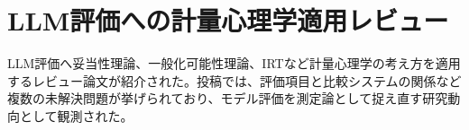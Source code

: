 \section{LLM評価への計量心理学適用レビュー}

LLM評価へ妥当性理論、一般化可能性理論、IRTなど計量心理学の考え方を適用するレビュー論文が紹介された。投稿では、評価項目と比較システムの関係など複数の未解決問題が挙げられており、モデル評価を測定論として捉え直す研究動向として観測された。


